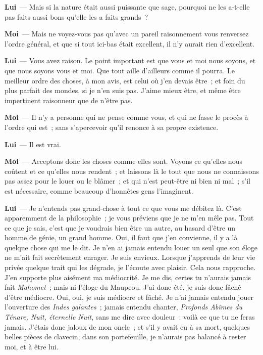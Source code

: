 \documentclass[french,twoside]{book} %
\newcommand{\labelchar}[1]{\textbf{\color{rubric} #1}}
\begin{document}
\labelchar{Lui} — Mais si la nature était aussi puissante que sage, pourquoi ne les a-t-elle pas faits aussi bons qu’elle les a faits grands ?\par
\labelchar{Moi} — Mais ne voyez-vous pas qu’avec un pareil raisonnement vous renversez l’ordre général, et que si tout ici-bas était excellent, il n’y aurait rien d’excellent.\par
\labelchar{Lui} — Vous avez raison. Le point important est que vous et moi nous soyons, et que nous soyons vous et moi. Que tout aille d’ailleurs comme il pourra. Le meilleur ordre des choses, à mon avis, est celui où j’en devais être ; et foin du plus parfait des mondes, si je n’en suis pas. J’aime mieux être, et même être impertinent raisonneur que de n’être pas.\par
\labelchar{Moi} — Il n’y a personne qui ne pense comme vous, et qui ne fasse le procès à l’ordre qui est ; sans s’apercevoir qu’il renonce à sa propre existence.\par
\labelchar{Lui} — Il est vrai.\par
\labelchar{Moi} — Acceptons donc les choses comme elles sont. Voyons ce qu’elles nous coûtent et ce qu’elles nous rendent ; et laissons là le tout que nous ne connaissons pas assez pour le louer ou le blâmer ; et qui n’est peut-être ni bien ni mal ; s’il est nécessaire, comme beaucoup d’honnêtes gens l’imaginent.\par
\labelchar{Lui} — Je n’entends pas grand-chose à tout ce que vous me débitez là. C’est apparemment de la philosophie ; je vous préviens que je ne m’en mêle pas. Tout ce que je sais, c’est que je voudrais bien être un autre, au hasard d’être un homme de génie, un grand homme. Oui, il faut que j’en convienne, il y a là quelque chose qui me le dit. Je n’en ai jamais entendu louer un seul que son éloge ne m’ait fait secrètement enrager. Je suis envieux. Lorsque j’apprends de leur vie privée quelque trait qui les dégrade, je l’écoute avec plaisir. Cela nous rapproche. J’en supporte plus aisément ma médiocrité. Je me dis, certes tu n’aurais jamais fait \emph{Mahomet} ; mais ni l’éloge du Maupeou. J’ai donc été, je suis donc fâché d’être médiocre. Oui, oui, je suis médiocre et fâché. Je n’ai jamais entendu jouer l’ouverture des \emph{Indes galantes} ; jamais entendu chanter, \emph{Profonds Abîmes du Ténare, Nuit, éternelle Nuit}, sans me dire avec douleur : voilà ce que tu ne feras jamais. J’étais donc jaloux de mon oncle ; et s’il y avait eu à sa mort, quelques belles pièces de clavecin, dans son portefeuille, je n’aurais pas balancé à rester moi, et à être lui.\par
\end{document}
